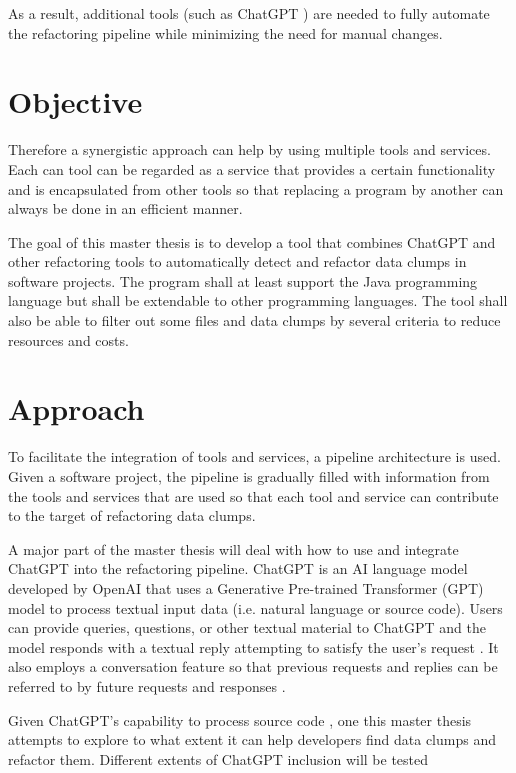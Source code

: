 As a result,  additional tools (such as ChatGPT \cite{ChatGPT_url}) are needed to fully automate the refactoring pipeline while minimizing the need for manual changes. 




\section{Objective}
Therefore a synergistic approach can help by using multiple tools and services.  Each can tool can be regarded as  a service that provides a certain functionality and is encapsulated from other tools so that replacing a program by another can always be done in an efficient manner. 


The goal of this master thesis is to develop a tool that  combines ChatGPT and other refactoring tools  to automatically detect and refactor data clumps in software projects. The program  shall at least support the Java programming language but shall be extendable to  other programming languages. The tool shall also  be able to filter out some files and data clumps by several criteria to reduce resources and costs. 



\section{Approach}

To facilitate the integration of tools and services, a pipeline architecture is used. Given a software project, the pipeline is gradually filled with information from the tools and services that are used so that each tool and service can contribute to the target of refactoring data clumps.

A major part of the master thesis will deal with how to use and integrate ChatGPT into the refactoring pipeline. 
ChatGPT is an AI language model developed by OpenAI that uses a Generative Pre-trained Transformer (GPT) model to process textual input data (i.e. natural language or source code). Users can provide queries, questions, or other textual material to ChatGPT and the model responds with a textual reply attempting to satisfy the user's request \cite{yetistirenEvaluatingCodeQuality2023}. It also employs a conversation feature so that previous requests and replies can be referred to by future requests and responses \cite{sobania2023analysis}.

Given ChatGPT's capability to process  source code \cite{sadik2023analysis}\cite{guo2023exploring}, one this master thesis attempts to explore to what extent it can help developers find data clumps and refactor them. Different extents of ChatGPT inclusion will be tested  

